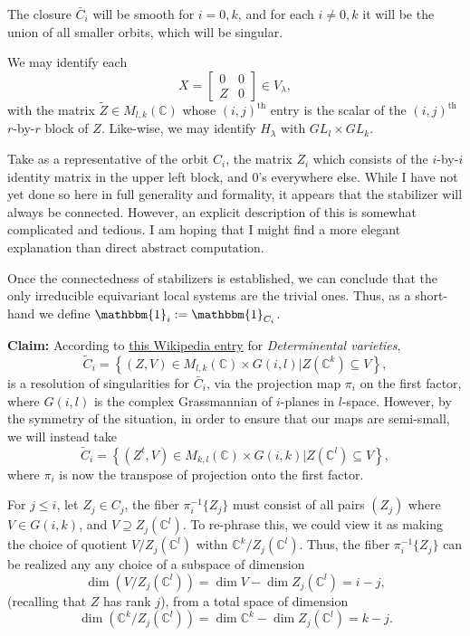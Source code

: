 \documentclass{memoir}
\newcommand{\lset}{\left\lbrace}
\newcommand{\rset}{\right\rbrace}
\newcommand{\lb}{\left(}
\newcommand{\rb}{\right)}
\newcommand{\bc}{\mathbb{C}}
\newcommand{\tx}{\text}
\theoremstyle{definition}
\begin{document}
	 The closure $\bar{C}_i$ will be smooth for $i=0, k$, and for each $i\neq 0, k$ it will be the union of all smaller orbits, which will be singular.
	 
		We may identify each
		$$X=\begin{bmatrix}
			0 & 0 \\
			Z & 0
		\end{bmatrix}\in V_\lambda,$$
	with the matrix $\tilde{Z}\in M_{l,k}(\bc)$ whose $(i,j)^{\tx{th}}$ entry is the scalar of the $(i,j)^{\tx{th}}$ $r$-by-$r$ block of $Z$.  
	Like-wise, we may identify $H_\lambda$ with $GL_l\times GL_k$.  
	  
	 Take as a representative of the orbit $C_i$, the matrix $Z_i$ which consists of the $i$-by-$i$ identity matrix in the upper left block, and 0's everywhere else.  
	 While I have not yet done so here in full generality and formality, it appears that the stabilizer will always be connected.  
	 However, an explicit description of this is somewhat complicated and tedious.  
	 I am hoping that I might find a more elegant explanation than direct abstract computation.  
	 
	 Once the connectedness of stabilizers is established, we can conclude that the only irreducible equivariant local systems are the trivial ones.  
	 Thus, as a short-hand we define $\mathbbm{1}_i:=\mathbbm{1}_{C_i}$. 
	
	\textbf{Claim:} According to \href{https://en.wikipedia.org/wiki/Determinantal_variety#:~:text=In%20algebraic%20geometry%2C%20determinantal%20varieties,product%20of%20two%20projective%20spaces.}{this Wikipedia entry} for \emph{Determinental varieties},\\
	 $$\tilde{C}_i=\lset(Z, V)\in M_{l,k}(\bc)\times G(i, l) |Z(\bc^k)\subseteq V\rset,$$
	  is a resolution of singularities for $\bar{C}_i$, via the projection map $\pi_i$ on the first factor, where $G(i, l)$ is the complex Grassmannian of $i$-planes in $l$-space.  
	 However, by the symmetry of the situation, in order to ensure that our maps are semi-small, we will instead take
	 $$\tilde{C}_i=\lset(Z^t, V)\in M_{k,l}(\bc)\times G(i, k)| Z(\bc^l)\subseteq V\rset,$$
	 where $\pi_i$ is now the transpose of projection onto the first factor. 
	
	For $j\leq i$, let $Z_j\in C_j$, the fiber $\pi_i^{-1}\{Z_j\}$ must consist of all pairs $(Z_j)$ where $V\in G(i, k)$, and $V\supseteq Z_j(\bc^l)$.  
	To re-phrase this, we could view it as making the choice of quotient $V/Z_j(\bc^l)$ withn $\bc^k/Z_j(\bc^l)$.  
	Thus, the fiber $\pi_i^{-1}\{Z_j\}$ can be realized any any choice of a subspace of dimension
	$$\dim \lb V/Z_j(\bc^l)\rb=\dim V-\dim Z_j(\bc^l)=i-j,$$
	(recalling that $Z$ has rank $j$), from a total space of dimension
	$$\dim\lb \bc^k/Z_j(\bc^l)\rb=\dim \bc^k-\dim Z_j(\bc^l)=k-j.$$
	
\end{document}
